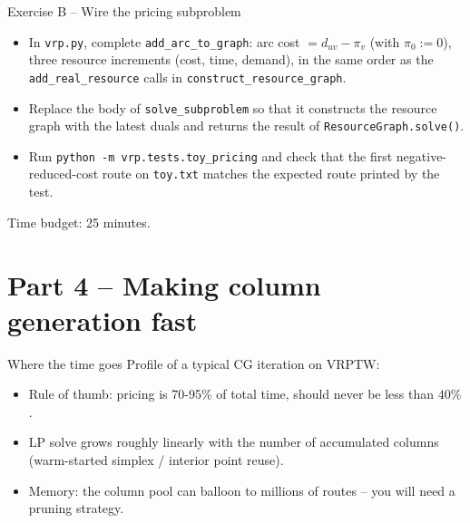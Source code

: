 \documentclass[10pt,aspectratio=169]{beamer}
\begin{document}
\begin{frame}{Exercise B -- Wire the pricing subproblem}
  \begin{exbox}
    \begin{itemize}\small
      \item In \texttt{vrp.py}, complete \texttt{add\_arc\_to\_graph}:
            arc cost $=d_{uv}-\pi_v$ (with $\pi_0:=0$), three resource
            increments (cost, time, demand), in the same order as the
            \texttt{add\_real\_resource} calls in
            \texttt{construct\_resource\_graph}.
      \item Replace the body of \texttt{solve\_subproblem} so that it
            constructs the resource graph with the latest duals and returns
            the result of \texttt{ResourceGraph.solve()}.
      \item Run \texttt{python -m vrp.tests.toy\_pricing} and check that the
            first negative-reduced-cost route on \texttt{toy.txt} matches
            the expected route printed by the test.
    \end{itemize}
    \alert{Time budget: 25 minutes.}
  \end{exbox}
\end{frame}

\section{Part 4 -- Making column generation fast}

\begin{frame}{Where the time goes}
  Profile of a typical CG iteration on VRPTW:
  \begin{center}
  \end{center}
  \begin{itemize}\small
    \item Rule of thumb: pricing is 70-95\% of total time, should never be less than $40\%$.
    \item LP solve grows roughly linearly with the number of accumulated columns
          (warm-started simplex / interior point reuse).
    \item Memory: the column pool can balloon to millions of routes -- you
          will need a pruning strategy.
  \end{itemize}
\end{frame}
\end{document}
